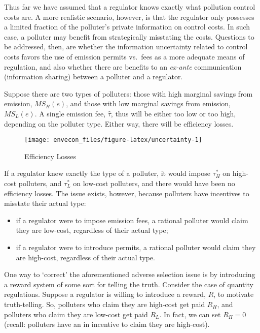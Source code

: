 \documentclass[
]{book}
\providecommand{\tightlist}{%
  \setlength{\itemsep}{0pt}\setlength{\parskip}{0pt}}
\begin{document}
Thus far we have assumed that a regulator knows exactly what pollution control costs are. A more realistic scenario, however, is that the regulator only possesses a limited fraction of the polluter's private information on control costs. In such case, a polluter may benefit from strategically misstating the costs. Questions to be addressed, then, are whether the information uncertainty related to control costs favors the use of emission permits vs.~fees as a more adequate means of regulation, and also whether there are benefits to an \emph{ex-ante} communication (information sharing) between a polluter and a regulator.

Suppose there are two types of polluters: those with high marginal savings from emission, \(MS_H(e)\), and those with low marginal savings from emission, \(MS_L(e)\). A single emission fee, \(\hat{\tau}\), thus will be either too low or too high, depending on the polluter type. Either way, there will be efficiency losses.

\begin{figure}

{\centering \texttt{[image: envecon\_files/figure-latex/uncertainty-1]} 

}

\caption{Efficiency Losses}\label{fig:uncertainty}
\end{figure}

If a regulator knew exactly the type of a polluter, it would impose \(\tau_H^*\) on high-cost polluters, and \(\tau_L^*\) on low-cost polluters, and there would have been no efficiency losses. The issue exists, however, because polluters have incentives to misstate their actual type:

\begin{itemize}
\tightlist
\item
  if a regulator were to impose emission fees, a rational polluter would claim they are low-cost, regardless of their actual type;
\item
  if a regulator were to introduce permits, a rational polluter would claim they are high-cost, regardless of their actual type.
\end{itemize}

One way to `correct' the aforementioned adverse selection issue is by introducing a reward system of some sort for telling the truth. Consider the case of quantity regulations. Suppose a regulator is willing to introduce a reward, \(R\), to motivate truth-telling. So, polluters who claim they are high-cost get paid \(R_H\), and polluters who claim they are low-cost get paid \(R_L\). In fact, we can set \(R_H=0\) (recall: polluters have an in incentive to claim they are high-cost).
\end{document}
